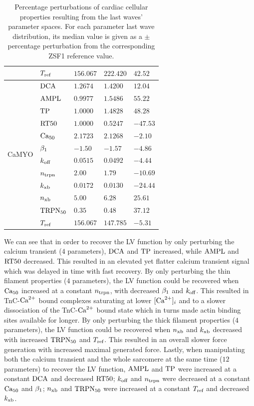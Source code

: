 \begin{table}[!ht]
\begin{tabularx}{\textwidth}{lXXXX}
    & $T_{\textrm{ref}}$ & $156.067$ & $222.420$ & $42.52$ \\
    \midrule
    \multirow{12}{*}{CaMYO} & $\textrm{DCA}$ & $1.2674$ & $1.4200$ & $12.04$ \\
    & $\textrm{AMPL}$ & $0.9977$ & $1.5486$ & $55.22$ \\
    & $\textrm{TP}$ & $1.0000$ & $1.4828$ & $48.28$ \\
    & $\textrm{RT50}$ & $1.0000$ & $0.5247$ & $-47.53$ \\
    & $\textrm{Ca}_{50}$ & $2.1723$ & $2.1268$ & $-2.10$ \\
    & $\beta_1$ & $-1.50$ & $-1.57$ & $-4.86$ \\
    & $k_{\textrm{off}}$ & $0.0515$ & $0.0492$ & $-4.44$ \\
    & $n_{\textrm{trpn}}$ & $2.00$ & $1.79$ & $-10.69$ \\
    & $k_{\textrm{xb}}$ & $0.0172$ & $0.0130$ & $-24.44$ \\
    & $n_{\textrm{xb}}$ & $5.00$ & $6.28$ & $25.61$ \\
    & $\textrm{TRPN}_{50}$ & $0.35$ & $0.48$ & $37.12$ \\
    & $T_{\textrm{ref}}$ & $156.067$ & $147.785$ & $-5.31$ \\
    \bottomrule
    \end{tabularx}
    \caption{Percentage perturbations of cardiac cellular properties resulting from the last waves' parameter spaces. For each parameter last wave distribution, its median value is given as a $\pm$ percentage perturbation from the corresponding ZSF1 reference value.}
    \label{tab:virtualdrugeffects}
\end{table}

\vspace{0.2cm}
We can see that in order to recover the LV function by only perturbing the calcium transient ($4$ parameters), $\textrm{DCA}$ and $\textrm{TP}$ increased, while $\textrm{AMPL}$ and $\textrm{RT50}$ decreased. This resulted in an elevated yet flatter calcium transient signal which was delayed in time with fast recovery. By only perturbing the thin filament properties ($4$ parameters), the LV function could be recovered when $\textrm{Ca}_{50}$ increased at a constant $n_{\textrm{trpn}}$, with decreased $\beta_1$ and $k_{\textrm{off}}$. This resulted in TnC-$\textrm{Ca}^{2+}$ bound complexes saturating at lower $[\textrm{Ca}^{2+}]_{i}$ and to a slower dissociation of the TnC-$\textrm{Ca}^{2+}$ bound state which in turns made actin binding sites available for longer. By only perturbing the thick filament properties ($4$ parameters), the LV function could be recovered when $n_{\textrm{xb}}$ and $k_{\textrm{xb}}$ decreased with increased $\textrm{TRPN}_{50}$ and $T_{\textrm{ref}}$. This resulted in an overall slower force generation with increased maximal generated force. Lastly, when manipulating both the calcium transient and the whole sarcomere at the same time ($12$ parameters) to recover the LV function, $\textrm{AMPL}$ and $\textrm{TP}$ were increased at a constant $\textrm{DCA}$ and decreased $\textrm{RT50}$; $k_{\textrm{off}}$ and $n_{\textrm{trpn}}$ were decreased at a constant $\textrm{Ca}_{50}$ and $\beta_1$; $n_{\textrm{xb}}$ and $\textrm{TRPN}_{50}$ were increased at a constant $T_{\textrm{ref}}$ and decreased $k_{\textrm{xb}}$.

